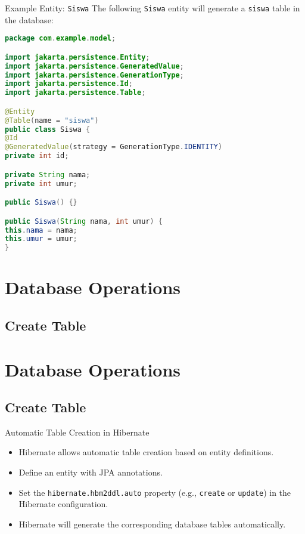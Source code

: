 \documentclass[aspectratio=169, table]{beamer}
\begin{document}
\begin{frame}[fragile]{Example Entity: \texttt{Siswa}}
\vspace{20pt}
The following \texttt{Siswa} entity will generate a \texttt{siswa} table in the database:

\begin{lstlisting}[language=Java, style=JavaStyle]
package com.example.model;

import jakarta.persistence.Entity;
import jakarta.persistence.GeneratedValue;
import jakarta.persistence.GenerationType;
import jakarta.persistence.Id;
import jakarta.persistence.Table;

@Entity
@Table(name = "siswa")
public class Siswa {
@Id
@GeneratedValue(strategy = GenerationType.IDENTITY)
private int id;

private String nama;
private int umur;

public Siswa() {}

public Siswa(String nama, int umur) {
this.nama = nama;
this.umur = umur;
}
\end{lstlisting}
\end{frame}


\section{Database Operations}

\subsection{Create Table}

\section{Database Operations}

\subsection{Create Table}

\begin{frame}{Automatic Table Creation in Hibernate}
	\vspace{20pt}
	\begin{itemize}
		\item Hibernate allows automatic table creation based on entity definitions.
		\item Define an entity with JPA annotations.
		\item Set the \texttt{hibernate.hbm2ddl.auto} property (e.g., \texttt{create} or \texttt{update}) in the Hibernate configuration.
		\item Hibernate will generate the corresponding database tables automatically.
	\end{itemize}
\end{frame}
\end{document}

